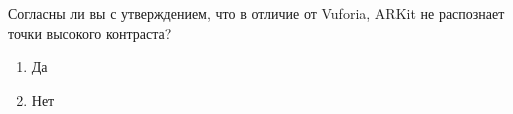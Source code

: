 
Согласны ли вы с утверждением, что в отличие от Vuforia, ARKit не распознает точки высокого контраста?

\begin{enumerate}
    \item Да
    \item Нет
\end{enumerate}